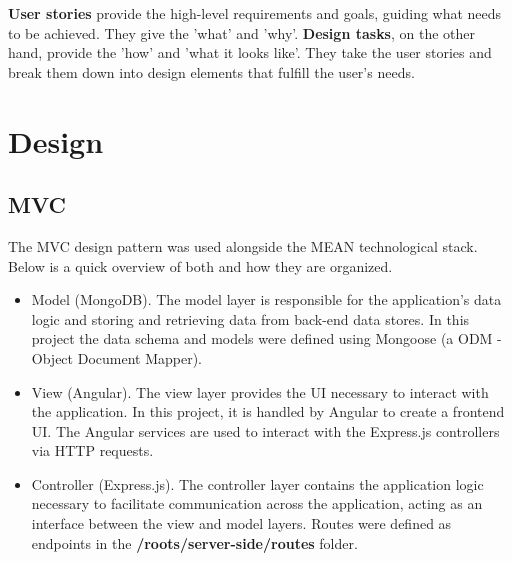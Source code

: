 \documentclass[multi, tikz, a4paper, oneside]{article}
\begin{document}
\textbf{User stories} provide the high-level requirements and goals, guiding
what needs to be achieved. They give the 'what' and 'why'. \textbf{Design
  tasks}, on the other hand, provide the 'how' and 'what it looks like'. They
take the user stories and break them down into design elements that fulfill the
user's needs.

\section{Design}

\subsection{MVC}
\label{sec:mvc-design}
The MVC design pattern was used alongside the MEAN technological stack. Below is a
quick overview of both and how they are organized.

\begin{itemize}
\item Model (MongoDB). The model layer is responsible for the application's data
  logic and storing and retrieving data from back-end data stores. In this
  project the data schema and models were defined using Mongoose (a ODM - Object
  Document Mapper).

\item View (Angular). The view layer provides the UI necessary to interact with
  the application. In this project, it is handled by Angular to create a
  frontend UI. The Angular services are used to interact with the Express.js
  controllers via HTTP requests.

\item Controller (Express.js). The controller layer contains the application
  logic necessary to facilitate communication across the application, acting as
  an interface between the view and model layers. Routes were defined as
  endpoints in the \textbf{/roots/server-side/routes} folder.
\end{itemize}
\end{document}
